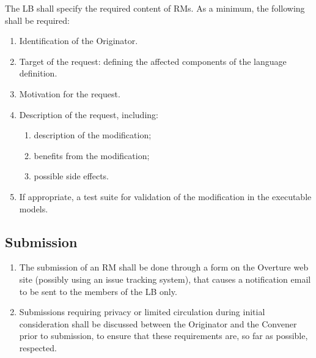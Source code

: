\documentclass[]{article}
\begin{document}
The LB shall specify the required content of RMs. As a minimum, the
following shall be required:
\begin{enumerate}
	\item Identification of the Originator.
	
	\item Target of the request: defining the affected components
          of the language definition.
	
	\item Motivation for the request.
	
	\item Description of the request, including:
	\begin{enumerate}
		\item description of the modification;
		
		\item benefits from the modification;
		
		\item possible side effects.
	\end{enumerate}
	
	
	\item If appropriate, a test suite for validation of the
          modification in the executable models. 
\end{enumerate}

\subsection{Submission} %
\label{sub:submitting_a_request_for_modification}

\begin{enumerate}
\item The submission of an RM shall be done through a form on the
  Overture web site (possibly using an issue tracking system), that
  causes a notification email to be sent to the members of the LB only. 

\item Submissions requiring privacy or limited circulation during
  initial consideration shall be discussed between the Originator and
  the Convener prior to submission, to ensure that these requirements
  are, so far as possible, respected.
\end{enumerate}
\end{document}
